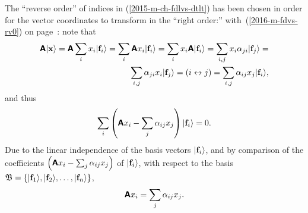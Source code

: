 The ``reverse order'' of indices in (\ref{2015-m-ch-fdlvs-dtlt}) has been chosen
in order for the vector coordinates to transform in the ``right order:''
with~(\ref{2016-m-fdvs-rv0}) on page~\pageref{2016-m-fdvs-rv0}: note that
\begin{equation}
\begin{split}
\textsf{\textbf{A}}\vert  {\bf x} \rangle =
\textsf{\textbf{A}} \sum_i x_i \vert  {\bf f}_i \rangle =
\sum_i \textsf{\textbf{A}} x_i \vert  {\bf f}_i \rangle =
\sum_i x_i \textsf{\textbf{A}} \vert  {\bf f}_i \rangle =
\sum_{i,j} x_i \alpha_{ji} \vert  {\bf f}_j \rangle =  \\
\sum_{i,j} \alpha_{ji}  x_i \vert  {\bf f}_j \rangle =
(i\leftrightarrow j) =
\sum_{i,j} \alpha_{ij}  x_j \vert  {\bf f}_i \rangle ,
\end{split}
\label{2016-m-ch-fdlvs-dtltk}
\end{equation}
and thus
\begin{equation}
\begin{split}
\sum_i
\left(
\textsf{\textbf{A}} x_i
-
\sum_{j} \alpha_{ij}  x_j
\right)
\vert  {\bf f}_i \rangle
=0
 .
\end{split}
\label{2016-m-ch-fdlvs-dtltk2}
\end{equation}
Due to the linear independence of the basis vectors  $\vert  {\bf f}_i \rangle$, and by comparison of the coefficients
$\left(
\textsf{\textbf{A}} x_i
-
\sum_{j} \alpha_{ij}  x_j
\right)$
of $\vert  {\bf f}_i \rangle$,
with respect to  the basis
${\frak B}=\{\vert {\bf f}_1 \rangle ,\vert {\bf f}_2 \rangle,\ldots ,\vert {\bf f}_n \rangle\}$,
\begin{equation}
\textsf{\textbf{A}} x_i = \sum_{j} \alpha_{ij}  x_j  .
\label{2016-m-ch-fdlvs-dtltk1}
\end{equation}



